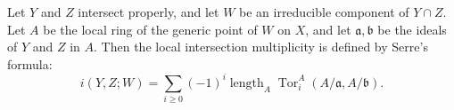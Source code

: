 Let $Y$ and $Z$ intersect properly, and let $W$ be an irreducible component of $Y \cap Z$. Let $A$ be the local ring of the generic point of $W$ on $X$, and let $\mathfrak{a}, \mathfrak{b}$ be the ideals of $Y$ and $Z$ in $A$. Then the local intersection multiplicity is defined by Serre's formula:
$$i(Y,Z; W) = \sum_{i \geq 0} (-1)^i \operatorname{length}_A \operatorname{Tor}_i^A(A/\mathfrak{a}, A/\mathfrak{b}).$$
